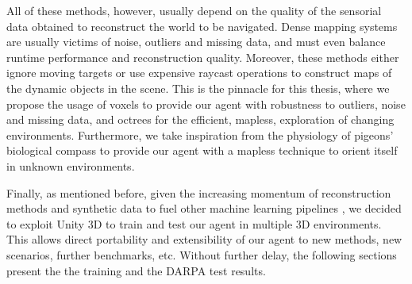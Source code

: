 All of these methods, however, usually depend on the quality of the sensorial data obtained to reconstruct the world to be navigated.
Dense mapping systems are usually victims of noise, outliers and missing data, and must even balance runtime performance and reconstruction quality. Moreover, these methods either ignore moving targets or use expensive raycast operations to construct maps of the dynamic objects in the scene. \cite{weder2020routedfusion, pfeiffer2018reinforced, grinvald2021tsdf} %
This is the pinnacle for this thesis, where we propose the usage of voxels to provide our agent with robustness to outliers, noise and missing data, and octrees for the efficient, mapless, exploration of changing environments. 
Furthermore, we take inspiration from the physiology of pigeons' biological compass to provide our agent with a mapless technique to orient itself in unknown environments.

Finally, as mentioned before, given the increasing momentum of reconstruction methods and synthetic data to fuel other machine learning pipelines \cite{yu2021plenoxels, nvidia2021synthetic}, we decided to exploit Unity 3D to train and test our agent in multiple 3D environments. This allows direct portability and extensibility of our agent to new methods, new scenarios, further benchmarks, etc. 
Without further delay, the following sections present the the training and the DARPA test results.









